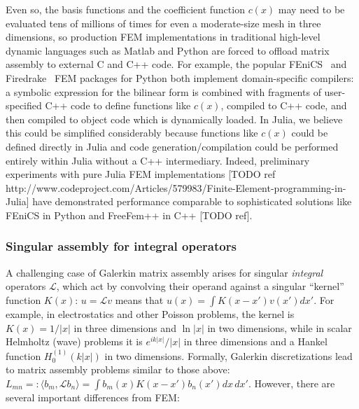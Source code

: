 Even so, the basis functions and the coefficient function $c(x)$ may need to be
evaluated tens of millions of times for even a moderate-size mesh in three dimensions,
so production FEM implementations in traditional high-level dynamic languages such as
Matlab and Python are forced to offload matrix assembly to external C and C++ code.
For example, the popular FEniCS~\cite{LoggOlgaardEtAl2012a} and
Firedrake~\cite{Rathgeber2015} FEM packages for
Python both implement domain-specific compilers: a symbolic expression for the bilinear
form is combined with fragments of user-specified C++ code to define functions like
$c(x)$, compiled to C++ code, and then compiled to object code which is dynamically
loaded.
In Julia, we believe this could be simplified considerably because functions like
$c(x)$ could be defined directly in Julia and code generation/compilation could be
performed entirely within Julia without a C++ intermediary.
Indeed, preliminary experiments with pure Julia FEM implementations
[TODO ref http://www.codeproject.com/Articles/579983/Finite-Element-programming-in-Julia]
have demonstrated performance comparable to sophisticated solutions like FEniCS in
Python and FreeFem++ in C++ [TODO ref].
\fi

\subsubsection{Singular assembly for integral operators}

A challenging case of Galerkin matrix assembly arises for singular
\emph{integral} operators $\mathcal{L}$, which act by
convolving their operand against a singular ``kernel'' function
$K(x)$: $u = \mathcal{L} v$ means that $u(x) = \int K(x - x') v(x')
dx'$.
For example, in electrostatics and other Poisson problems, the
kernel is $K(x) = 1/|x|$ in three dimensions and $\ln |x|$ in two
dimensions, while in scalar Helmholtz (wave) problems it is
$e^{ik|x|}/|x|$ in three dimensions and a Hankel function
$H^{(1)}_0(k|x|)$ in two dimensions.
Formally, Galerkin discretizations lead to matrix assembly problems
similar to those above:
$L_{mn} =: \langle b_m, \mathcal{L} b_n \rangle = \int b_m(x) K(x - x') b_n(x') dx\,dx'$.
However, there are several important differences from FEM:

